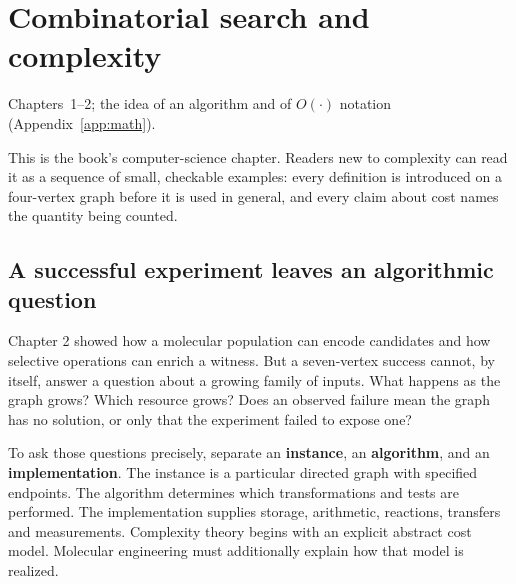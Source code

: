 \chapter{Combinatorial search and complexity}\label{ch:complexity}
{Chapters~1--2; the idea of an algorithm and of $O(\cdot)$ notation (Appendix~\ref{app:math}).}

\begin{CSBridge}
This is the book's computer-science chapter. Readers new to complexity can read
it as a sequence of small, checkable examples: every definition is introduced on
a four-vertex graph before it is used in general, and every claim about cost
names the quantity being counted.
\end{CSBridge}



\section{A successful experiment leaves an algorithmic
question}\label{a-successful-experiment-leaves-an-algorithmic-question}

Chapter 2 showed how a molecular population can encode candidates and
how selective operations can enrich a witness. But a seven-vertex
success cannot, by itself, answer a question about a growing family of
inputs. What happens as the graph grows? Which resource grows? Does an
observed failure mean the graph has no solution, or only that the
experiment failed to expose one?

To ask those questions precisely, separate an \textbf{instance}, an
\textbf{algorithm}, and an \textbf{implementation}. The instance is a
particular directed graph with specified endpoints. The algorithm
determines which transformations and tests are performed. The
implementation supplies storage, arithmetic, reactions, transfers and
measurements. Complexity theory begins with an explicit abstract cost
model. Molecular engineering must additionally explain how that model is
realized.


